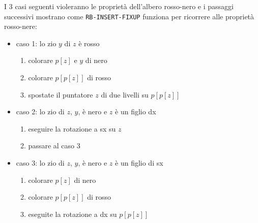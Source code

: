 I 3 casi seguenti violeranno le proprietà dell'albero rosso-nero e i passaggi successivi mostrano come \verb|RB-INSERT-FIXUP| funziona per ricorrere alle proprietà rosso-nere:
\begin{itemize}
    \item caso 1: lo zio $y$ di $z$ è rosso
    \begin{enumerate}
        \item colorare $p[z]$ e $y$ di nero
        \item colorare $p[p[z]]$ di rosso
        \item spostate il puntatore $z$ di due livelli su $p[p[z]]$
    \end{enumerate}
    \item caso 2: lo zio di $z$, $y$, è nero e $z$ è un figlio dx
    \begin{enumerate}
        \item eseguire la rotazione a sx su $z$
        \item passare al caso 3
    \end{enumerate}
    \item caso 3: lo zio di $z$, $y$, è nero e $z$ è un figlio di sx
    \begin{enumerate}
        \item colorare $p[z]$ di nero
        \item colorare $p[p[z]]$ di rosso
        \item eseguite la rotazione a dx su $p[p[z]]$
    \end{enumerate}
\end{itemize}
